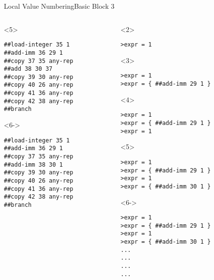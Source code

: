 \documentclass{beamer}
\begin{document}
\begin{frame}[fragile]{Local Value Numbering}{Basic Block 3}
\begin{columns}[t,onlytextwidth]
\begin{column}[t]{.4\textwidth}
\begin{onlyenv}
      \end{onlyenv}
      \begin{onlyenv}<5>
      \begin{Verbatim}[frame=single]
##load-integer 35 1
##add-imm 36 29 1
##copy 37 35 any-rep
##add 38 30 37
##copy 39 30 any-rep
##copy 40 26 any-rep
##copy 41 36 any-rep
##copy 42 38 any-rep
##branch
      \end{Verbatim}
      \end{onlyenv}
      \begin{onlyenv}<6->
      \begin{Verbatim}[frame=single]
##load-integer 35 1
##add-imm 36 29 1
##copy 37 35 any-rep
##add-imm 38 30 1
##copy 39 30 any-rep
##copy 40 26 any-rep
##copy 41 36 any-rep
##copy 42 38 any-rep
##branch
      \end{Verbatim}
      \end{onlyenv}
    \end{column}

    \begin{column}[t]{.5\textwidth}
      \begin{onlyenv}<2>
        \begin{Verbatim}
>expr = 1
        \end{Verbatim}
      \end{onlyenv}
      \begin{onlyenv}<3>
        \begin{Verbatim}
>expr = 1
>expr = { ##add-imm 29 1 }
        \end{Verbatim}
      \end{onlyenv}
      \begin{onlyenv}<4>
        \begin{Verbatim}
>expr = 1
>expr = { ##add-imm 29 1 }
>expr = 1
        \end{Verbatim}
      \end{onlyenv}
      \begin{onlyenv}<5>
        \begin{Verbatim}
>expr = 1
>expr = { ##add-imm 29 1 }
>expr = 1
>expr = { ##add-imm 30 1 }
        \end{Verbatim}
      \end{onlyenv}
      \begin{onlyenv}<6->
        \begin{Verbatim}
>expr = 1
>expr = { ##add-imm 29 1 }
>expr = 1
>expr = { ##add-imm 30 1 }
...
...
...
...
        \end{Verbatim}
      \end{onlyenv}
    \end{column}
  \end{columns}
\end{frame}
\end{document}
